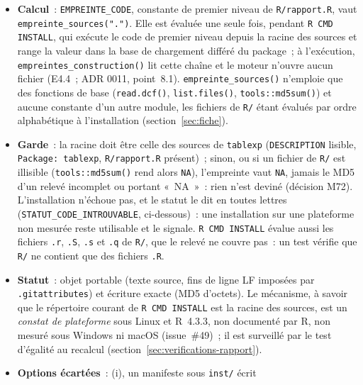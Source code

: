 \documentclass[a4paper,11pt]{article}
\newcommand{\code}[1]{\texttt{\small #1}}
\begin{document}
\begin{itemize}[leftmargin=*, itemsep=2pt]
    même constat, rapporté (ADR 0011, annotation du 27/10/2026, (c))~; sous macOS,
    \textbf{non mesurée} (décision M61)~: le \code{md5sum} de GNU n'y est
    pas installé par défaut (hypothèse), et la commande ne vaut qu'avec lui,
    d'où la mention «~GNU coreutils~» dans le libellé.
  \item \sloppy \textbf{Calcul}~: \code{EMPREINTE\_CODE}, constante de premier niveau
    de \code{R/rapport.R}, vaut \code{empreinte\_sources(".")}. Elle est
    évaluée une seule fois, pendant \code{R CMD INSTALL}, qui exécute le code
    de premier niveau depuis la racine des sources et range la valeur dans la
    base de chargement différé du package~; à l'exécution,
    \code{empreintes\_construction()} lit cette chaîne et le moteur n'ouvre
    aucun fichier (E4.4~; ADR 0011, point~8.1). \code{empreinte\_sources()}
    n'emploie que des fonctions de base (\code{read.dcf()},
    \code{list.files()}, \code{tools::md5sum()}) et aucune constante d'un
    autre module, les fichiers de \code{R/} étant évalués par ordre
    alphabétique à l'installation (section~\ref{sec:fiche}).
  \item \textbf{Garde}~: la racine doit être celle des sources de
    \code{tablexp} (\code{DESCRIPTION} lisible, \code{Package: tablexp},
    \code{R/rapport.R} présent)~; sinon, ou si un fichier de \code{R/} est
    illisible (\code{tools::md5sum()} rend alors \code{NA}), l'empreinte vaut
    \code{NA}, jamais le MD5 d'un relevé incomplet ou portant «~NA~»~: rien
    n'est deviné (décision M72). L'installation n'échoue pas, et le statut le
    dit en toutes lettres (\code{STATUT\_CODE\_INTROUVABLE}, ci-dessous)~:
    une installation sur une plateforme non mesurée reste utilisable et le
    signale. \code{R CMD INSTALL} évalue aussi les fichiers \code{.r},
    \code{.S}, \code{.s} et \code{.q} de \code{R/}, que le relevé ne couvre
    pas~: un test vérifie que \code{R/} ne contient que des fichiers
    \code{*.R}.
  \item \textbf{Statut}~: objet portable (texte source, fins de ligne LF
    imposées par \code{.gitattributes}) et écriture exacte (MD5 d'octets).
    Le mécanisme, à savoir que le répertoire courant de \code{R CMD INSTALL}
    est la racine des sources, est un \emph{constat de plateforme} sous Linux
    et R~4.3.3, non documenté par R, non mesuré sous Windows ni macOS
    (issue~\#49)~; il est surveillé par le test d'égalité au recalcul
    (section~\ref{sec:verifications-rapport}).
  \item \textbf{Options écartées}~: (i), un manifeste sous \code{inst/} écrit

\end{itemize}
\end{document}
